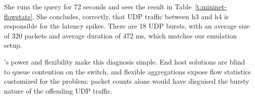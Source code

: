 
She runs the query for 72 seconds and sees the result in
Table~\ref{t:mininet-flowstats}. She concludes, correctly, that UDP traffic
between {\ct h3} and {\ct h4} is responsible for the latency spikes.
There are 18 UDP bursts, with an average size of 320 packets and
average duration of 472 ms, which matches our emulation setup.

\TheSystem's power and flexibility make this diagnosis simple. End host solutions
 are blind to queue contention on the switch, and flexible
aggregations expose flow statistics customized for the problem:
packet counts alone would have disguised the bursty nature of
the offending UDP traffic.

